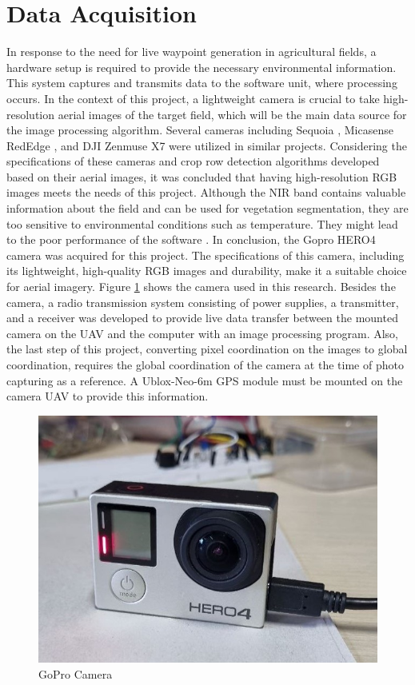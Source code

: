 \documentclass[conference]{IEEEtran}
\begin{document}
\section{Data Acquisition}\label{Data Acquisition}
In response to the need for live waypoint generation in agricultural fields, a hardware setup is required to provide the necessary environmental information. This system captures and transmits data to the software unit, where processing occurs. In the context of this project, a lightweight camera is crucial to take high-resolution aerial images of the target field, which will be the main data source for the image processing algorithm. Several cameras including Sequoia
\cite{b9,b4,b7,b6}
, Micasense RedEdge
\cite{b9,b14}, and DJI Zenmuse X7
\cite{b5} were utilized in similar projects. Considering the specifications of these cameras and crop row detection algorithms developed based on their aerial images, it was concluded that having high-resolution RGB images meets the needs of this project. Although the NIR band contains valuable information about the field and can be used for vegetation segmentation, they are too sensitive to environmental conditions such as temperature. They might lead to the poor performance of the software
\cite{b5}. In conclusion, the Gopro HERO4 camera was acquired for this project. The specifications of this camera, including its lightweight, high-quality RGB images and durability, make it a suitable choice for aerial imagery. Figure
\ref{gopro} shows the camera used in this research.
Besides the camera, a radio transmission system consisting of power supplies, a transmitter, and a receiver was developed to provide live data transfer between the mounted camera on the UAV and the computer with an image processing program.
Also, the last step of this project, converting pixel coordination on the images to global coordination, requires the global coordination of the camera at the time of photo capturing as a reference. A Ublox-Neo-6m GPS module must be mounted on the camera UAV to provide this information.

\begin{figure}[h]
\includegraphics[width=\linewidth]{GoPro.jpg}
\caption{GoPro Camera}
\label{gopro}
\end{figure}
\end{document}
